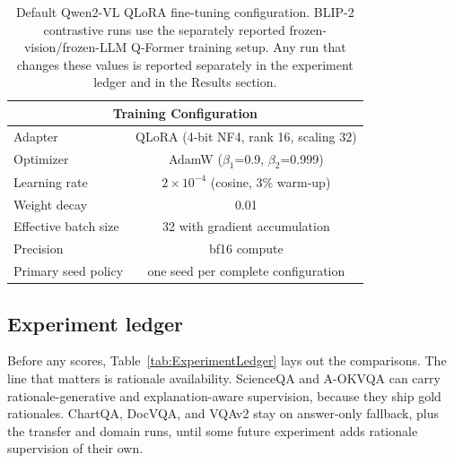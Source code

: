 \documentclass[preprint,12pt]{elsarticle}
\begin{document}
\begin{table}[!ht]
\centering
\caption{Default Qwen2-VL QLoRA fine-tuning configuration. BLIP-2 contrastive runs use the separately reported frozen-vision/frozen-LLM Q-Former training setup. Any run that changes these values is reported separately in the experiment ledger and in the Results section.}
\label{tab:Config}
\begin{tabular}{|l|c|}
\hline
\multicolumn{2}{|c|}{\textbf{Training Configuration}} \\ \hline
Adapter & QLoRA (4-bit NF4, rank 16, scaling 32) \\
Optimizer & AdamW ($\beta_1$=0.9, $\beta_2$=0.999) \\
Learning rate & $2 \times 10^{-4}$ (cosine, 3\% warm-up) \\
Weight decay & 0.01 \\
Effective batch size & 32 with gradient accumulation \\
Precision & bf16 compute \\
Primary seed policy & one seed per complete configuration \\ \hline
\end{tabular}
\end{table}

\subsection{Experiment ledger}
Before any scores, Table~\ref{tab:ExperimentLedger} lays out the comparisons.
The line that matters is rationale availability.
ScienceQA and A-OKVQA can carry rationale-generative and explanation-aware supervision, because they ship gold rationales.
ChartQA, DocVQA, and VQAv2 stay on answer-only fallback, plus the transfer and domain runs, until some future experiment adds rationale supervision of their own.
\end{document}
